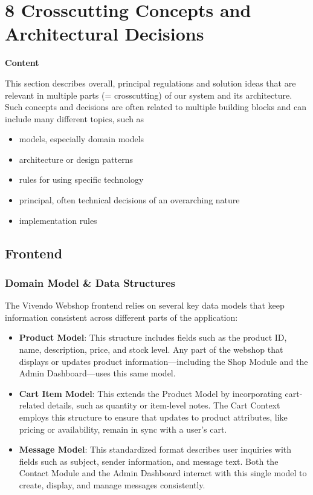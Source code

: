 \hypertarget{section-concepts}{%
\section{8 Crosscutting Concepts and Architectural Decisions}\label{section-concepts}}

\textbf{Content}

This section describes overall, principal regulations and solution ideas that are relevant in multiple parts (= crosscutting) of our system and its architecture. Such concepts and decisions are often related to multiple building blocks and can include many different topics, such as

\begin{itemize}
  \item
    models, especially domain models
  \item
    architecture or design patterns
  \item
    rules for using specific technology
  \item
    principal, often technical decisions of an overarching nature
  \item
    implementation rules
  \end{itemize}

\subsection{Frontend}

\subsubsection{Domain Model \& Data Structures}
The Vivendo Webshop frontend relies on several key data models that keep information consistent across different parts of the application:

\begin{itemize}
  \item \textbf{Product Model}: This structure includes fields such as the product ID, name, description, price, and stock level. Any part of the webshop that displays or updates product information---including the Shop Module and the Admin Dashboard---uses this same model.
  
  \item \textbf{Cart Item Model}: This extends the Product Model by incorporating cart-related details, such as quantity or item-level notes. The Cart Context employs this structure to ensure that updates to product attributes, like pricing or availability, remain in sync with a user's cart.
  
  \item \textbf{Message Model}: This standardized format describes user inquiries with fields such as subject, sender information, and message text. Both the Contact Module and the Admin Dashboard interact with this single model to create, display, and manage messages consistently.
\end{itemize}

